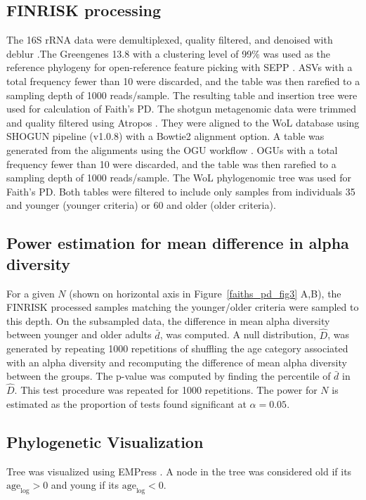 \subsection{FINRISK processing}
The 16S rRNA data were demultiplexed, quality filtered, and denoised with deblur \cite{Amir2017-sk}.The Greengenes \cite{McDonald2012-zv} 13.8 with a clustering level of 99\% was used as the reference phylogeny for open-reference feature picking with SEPP \cite{Mirarab2012-jh}. ASVs with a total frequency fewer than 10 were discarded, and the table was then rarefied to a sampling depth of 1000 reads/sample. The resulting table and insertion tree were used for calculation of Faith's PD.
The shotgun metagenomic data were trimmed and quality filtered using Atropos \cite{Didion2017-pl}. They were aligned to the WoL database using SHOGUN pipeline (v1.0.8) with a Bowtie2 alignment option. A table was generated from the alignments using the OGU workflow \cite{Zhu2021-ap}.  OGUs with a total frequency fewer than 10 were discarded, and the table was then rarefied to a sampling depth of 1000 reads/sample. The WoL phylogenomic tree \cite{Zhu2021-ap,Zhu2019-od} was used for Faith's PD.
Both tables were filtered to include only samples from individuals 35 and younger (younger criteria) or 60 and older (older criteria).

\subsection{Power estimation for mean difference in alpha diversity}
For a given $N$ (shown on horizontal axis in Figure~\ref{faiths_pd_fig3} A,B), the FINRISK processed samples matching the younger/older criteria were sampled to this depth. On the subsampled data, the difference in mean alpha diversity between younger and older adults $\bar{d}$, was computed. A null distribution, $\hat{D}$, was generated by repeating 1000 repetitions of shuffling the  age category associated with an alpha diversity and recomputing the difference of mean alpha diversity between the groups. The p-value was computed by finding the percentile of $\bar{d}$ in $\hat{D}$.
This test procedure was repeated for 1000 repetitions. The power for $N$ is estimated as the proportion of tests found significant at $\alpha = 0.05$.

\subsection{Phylogenetic Visualization}
Tree was visualized using EMPress \cite{Cantrell2021-mx}. A node in the tree was considered old if its $\text{age}_{\text{log}} > 0$ and young if its $\text{age}_{\text{log}} < 0$.

